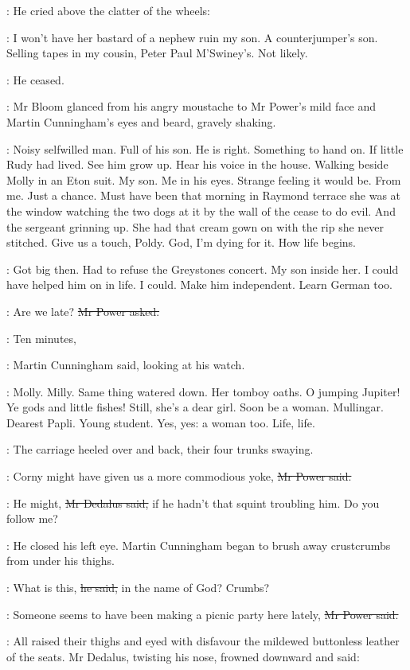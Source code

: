 :
He cried above the clatter of the wheels:

\simon:
I won't have her bastard of a nephew ruin my son.
A counterjumper's son.
Selling tapes in my cousin, Peter Paul M'Swiney's.
Not likely.

:
He ceased.

:
Mr Bloom glanced from his angry moustache
to Mr Power's mild face
and Martin Cunningham's eyes and beard,
gravely shaking.

\BloomInt:
Noisy selfwilled man.
Full of his son.
He is right.
Something to hand on.
If little Rudy had lived.
See him grow up.
Hear his voice in the house.
Walking beside Molly in an Eton suit.
My son.
Me in his eyes.
Strange feeling it would be.
From me.
Just a chance.
Must have been that morning in Raymond terrace
she was at the window watching the two dogs at it
by the wall of the cease to do evil.
And the sergeant grinning up.
She had that cream gown on with the rip she never stitched.
Give us a touch, Poldy.
God, I'm dying for it.
How life begins.

\BloomInt:
Got big then.
Had to refuse the Greystones concert.
My son inside her.
I could have helped him on in life.
I could.
Make him independent.
Learn German too.

\power:
Are we late?
\sout{Mr Power asked.}

\cunningham:
Ten minutes,

:
Martin Cunningham said, looking at his watch.

\BloomInt:
Molly.
Milly.
Same thing watered down.
Her tomboy oaths.
O jumping Jupiter!
Ye gods and little fishes!
Still, she's a dear girl.
Soon be a woman.
Mullingar.
Dearest Papli.
Young student.
Yes, yes:
a woman too.
Life, life.

:
The carriage heeled over and back,
their four trunks swaying.

\power:
Corny might have given us a more commodious yoke,
\sout{Mr Power said.}

\simon:
He might,
\sout{Mr Dedalus said,}
if he hadn't that squint troubling him.
Do you follow me?

:
He closed his left eye.
Martin Cunningham began to brush away crustcrumbs from under his thighs.

\cunningham:
What is this,
\sout{he said,}
in the name of God?
Crumbs?

\power:
Someone seems to have been making a picnic party here lately,
\sout{Mr Power said.}

:
All raised their thighs and eyed with disfavour
the mildewed buttonless leather of the seats.
Mr Dedalus, twisting his nose, frowned downward and said:

